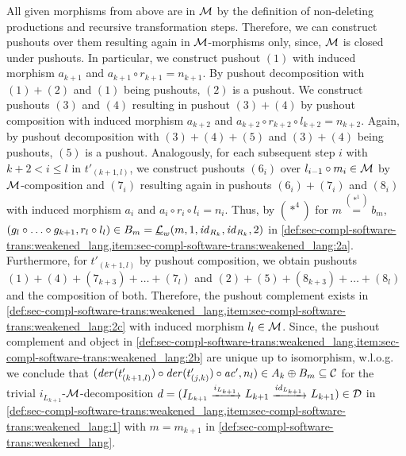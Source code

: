 \begin{enumerate}
\begin{center}
\end{center} 
  All given morphisms from above are in ${\cal M}$ by the definition of non-deleting productions and recursive transformation steps.
  Therefore, we can construct pushouts over them resulting again in ${\cal M}$-morphisms only, since, ${\cal M}$ is closed under pushouts.
  In particular, we construct pushout $(1)$ with induced morphism $a_{k+1}$ and $a_{k+1} \circ r_{k+1}=n_{k+1}$.
  By pushout decomposition with $(1)+(2)$ and $(1)$ being pushouts, $(2)$ is a pushout.
  We construct pushouts $(3)$ and $(4)$ resulting in pushout $(3)+(4)$ by pushout composition with induced morphism $a_{k+2}$ and $a_{k+2} \circ r_{k+2} \circ l_{k+2}=n_{k+2}$.
  Again, by pushout decomposition with $(3)+(4)+(5)$ and $(3)+(4)$ being pushouts, $(5)$ is a pushout.
  Analogously, for each subsequent step $i$ with $k+2 < i \leq l$ in $t'_{(k+1,l)}$, we construct pushouts $(6_i)$ over $l_{i-1}\circ m_i \in {\cal M}$ by ${\cal M}$-composition and $(7_i)$ resulting again in pushouts $(6_i)+(7_i)$ and $(8_i)$ with induced morphism $a_i$ and $a_i \circ r_i \circ l_i=n_i$.
  Thus, by $(*^4)$ for $m\stackrel{(*^1)}{=}b_m$, $(g_l \circ \ldots \circ g_{k+1},r_l \circ l_l) \in B_m=\underline{\mathcal{L}}_w(m,1,\mathit{id}_{R_k},\mathit{id}_{R_k},2)$ in \cref{def:sec-compl-software-trans:weakened_lang,item:sec-compl-software-trans:weakened_lang:2a}.
  Furthermore, for $t'_{(k+1,l)}$ by pushout composition, we obtain pushouts $(1)+(4)+(7_{k+3})+\ldots +(7_l)$ and $(2)+(5)+(8_{k+3})+\ldots +(8_l)$ and the composition of both.
  Therefore, the pushout complement exists in \cref{def:sec-compl-software-trans:weakened_lang,item:sec-compl-software-trans:weakened_lang:2c} with induced morphism $l_l \in {\cal M}$.
  Since, the pushout complement and object in \cref{def:sec-compl-software-trans:weakened_lang,item:sec-compl-software-trans:weakened_lang:2b} are unique up to isomorphism, w.l.o.g. we conclude that $(\mathit{der}(t'_{(k+1,l)}) \circ \mathit{der}(t'_{(j,k)}) \circ \mathit{ac}',n_l) \in A_k \oplus B_m \subseteq \mathcal{C}$ for the trivial $i_{L_{k+1}}$-${\cal M}$-decomposition $d=(I_{L_{k+1}} \trans{i_{L_{k+1}}} L_{k+1} \trans{\id_{L_{k+1}}} L_{k+1}) \in \mathcal{D}$ in \cref{def:sec-compl-software-trans:weakened_lang,item:sec-compl-software-trans:weakened_lang:1} with $m=m_{k+1}$ in \cref{def:sec-compl-software-trans:weakened_lang}.

\end{enumerate}
